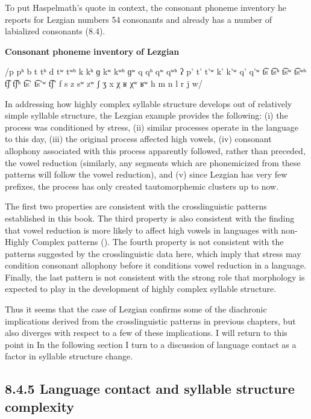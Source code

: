 To put Haspelmath’s quote in context, the consonant phoneme inventory he reports for Lezgian numbers 54 consonants and already has a number of labialized consonants (8.4).



\ea\label{ex:(8.4)}
  \textbf{Consonant} \textbf{phoneme} \textbf{inventory} \textbf{of} \textbf{Lezgian}



/p pʰ b t tʰ d tʷ tʷʰ k kʰ ɡ kʷ kʷʰ ɡʷ q qʰ qʷ qʷʰ ʔ p’ t’ t’ʷ k’ k’ʷ q’ q’ʷ t͡s t͡sʰ t͡sʷ t͡sʷʰ t͡ʃ t͡ʃʰ t͡s’ t͡s’ʷ t͡ʃ’ f s z sʷ zʷ ʃ ʒ x χ ʁ χʷ ʁʷ h m n l r j w/

\z


  In addressing how highly complex syllable structure develops out of relatively simple syllable structure, the Lezgian example provides the following: (i) the process was conditioned by stress, (ii) similar processes operate in the language to this day, (iii) the original process affected high vowels, (iv) consonant allophony associated with this process apparently followed, rather than preceded, the vowel reduction (similarly, any segments which are phonemicized from these patterns will follow the vowel reduction), and (v) since Lezgian has very few prefixes, the process has only created tautomorphemic clusters up to now. 



  The first two properties are consistent with the crosslinguistic patterns established in this book. The third property is also consistent with the finding that vowel reduction is more likely to affect high vowels in languages with non-Highly Complex patterns (). The fourth property is not consistent with the patterns suggested by the crosslinguistic data here, which imply that stress may condition consonant allophony before it conditions vowel reduction in a language. Finally, the last pattern is not consistent with the strong role that morphology is expected to play in the development of highly complex syllable structure.



  Thus it seems that the case of Lezgian confirms some of the diachronic implications derived from the crosslinguistic patterns in previous chapters, but also diverges with respect to a few of these implications. I will return to this point in  In the following section I turn to a discussion of language contact as a factor in syllable structure change.


\subsection{8.4.5 Language contact and syllable structure complexity}

